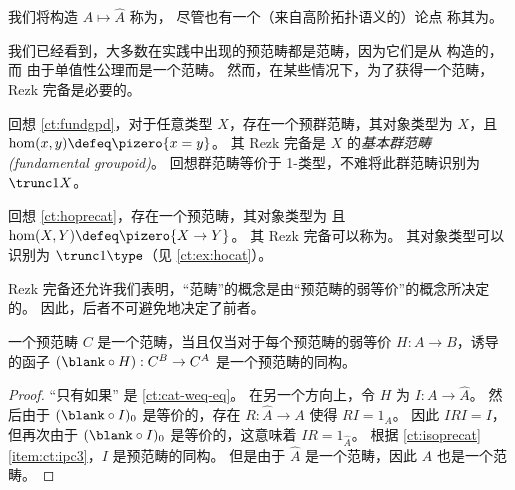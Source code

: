 我们将构造 $A\mapsto \widehat A$ 称为，
尽管也有一个（来自高阶拓扑语义的）论点
%
称其为。
%
%

我们已经看到，大多数在实践中出现的预范畴都是范畴，因为它们是从 \uset 构造的，而 \uset 由于单值性公理而是一个范畴。
然而，在某些情况下，为了获得一个范畴，Rezk 完备是必要的。

\begin{eg}\label{ct:rezk-fundgpd-trunc1}
回想 \cref{ct:fundgpd}，对于任意类型 $X$，存在一个预群范畴，其对象类型为 $X$，且 $\hom(x,y) \defeq \pizero{x=y}$。
%
%
%
其 Rezk 完备是 $X$ 的\emph{基本群范畴 (fundamental groupoid)}。
回想群范畴等价于 1-类型，不难将此群范畴识别为 $\trunc1X$。
\end{eg}

\begin{eg}\label{ct:hocat}
回想 \cref{ct:hoprecat}，存在一个预范畴，其对象类型为 \type 且 $\hom(X,Y) \defeq \pizero{X\to Y}$。
其 Rezk 完备可以称为。
%
%
其对象类型可以识别为 $\trunc1\type$（见 \cref{ct:ex:hocat}）。
\end{eg}

Rezk 完备还允许我们表明，“范畴”的概念是由“预范畴的弱等价”的概念所决定的。
因此，后者不可避免地决定了前者。

\begin{thm}\label{ct:weq-iso-precat-cat}
一个预范畴 $C$ 是一个范畴，当且仅当对于每个预范畴的弱等价 $H:A\to B$，诱导的函子 $(\blank\circ H):C^B \to C^A$ 是一个预范畴的同构。
\end{thm}
\begin{proof}
  “只有如果” 是 \cref{ct:cat-weq-eq}。
  在另一个方向上，令 $H$ 为 $I:A\to\widehat A$。
  然后由于 $(\blank\circ I)_0$ 是等价的，存在 $R:\widehat A\to A$ 使得 $RI=1_A$。
  因此 $IRI=I$，但再次由于 $(\blank\circ I)_0$ 是等价的，这意味着 $IR =1_{\widehat A}$。
  根据 \cref{ct:isoprecat}\ref{item:ct:ipc3}，$I$ 是预范畴的同构。
  但是由于 $\widehat A$ 是一个范畴，因此 $A$ 也是一个范畴。
\end{proof}

%


\newpage
\sectionNotes

